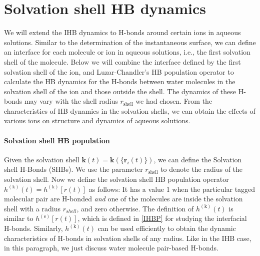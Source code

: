 \FloatBarrier
\section{Solvation shell HB dynamics} \label{PARA_SHBD}
We will extend the IHB dynamics to H-bonds around certain ions in aqueous solutions. 
Similar to the determination of the instantaneous surface, we can define an interface for each molecule or ion in aqueous solutions, i.e., 
the first solvation shell of the molecule. 
Below we will combine the interface defined by the first solvation shell of the ion, 
and Luzar-Chandler's HB population operator \cite{AL96} to calculate the HB
dynamics for the H-bonds between water molecules in the solvation shell of the ion and those outside the shell. 
The dynamics of these H-bonds may vary with the shell radius $r_\text{shell}$ we had chosen.
From the characteristics of HB dynamics in the solvation shells, we can obtain the effects of various ions on structure and dynamics of aqueous solutions. 

\paragraph{Solvation shell HB population}
Given the solvation shell ${\mathbf k}(t)={\mathbf k}(\{{\mathbf r}_i(t)\})$, we can define the Solvation shell H-Bonds (SHBs).
We use the parameter $r_\text{shell}$ to denote the radius of the solvation shell.
Now we define the solvation shell HB population operator $h^{(\text{k})}(t) = h^{(\text{k})}[{r}(t)]$ as follows:
It has a value 1 when the particular tagged molecular pair are H-bonded \emph{and} one of the molecules are inside the solvation shell
with a radius $r_{shell}$, and zero otherwise. 
The definition of $h^{(\text{k})}(t)$ is similar to $h^{(\text{s})}[{r}(t)]$, which is defined in \ref{IHBP} for studying the interfacial H-bonds.
Similarly, $h^{(\text{k})}(t)$ can be used efficiently to obtain the dynamic characteristics of H-bonds in solvation shells of any radius. 
Like in the IHB case, in this paragraph, we just discuss water molecule pair-based H-bonds. 

